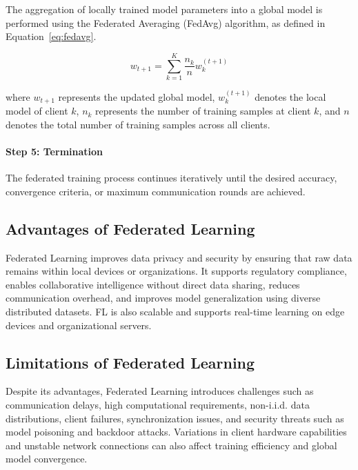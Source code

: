 The aggregation of locally trained model parameters into a global model is performed using the Federated Averaging (FedAvg) algorithm, as defined in Equation~\eqref{eq:fedavg}.

\begin{equation}
w_{t+1} = \sum_{k=1}^{K} \frac{n_k}{n} w_k^{(t+1)}
\label{eq:fedavg}
\end{equation}

where \(w_{t+1}\) represents the updated global model, \(w_k^{(t+1)}\) denotes the local model of client \(k\), \(n_k\) represents the number of training samples at client \(k\), and \(n\) denotes the total number of training samples across all clients.

\paragraph{Step 5: Termination}

The federated training process continues iteratively until the desired accuracy, convergence criteria, or maximum communication rounds are achieved.

\subsection{Advantages of Federated Learning}

Federated Learning improves data privacy and security by ensuring that raw data remains within local devices or organizations. It supports regulatory compliance, enables collaborative intelligence without direct data sharing, reduces communication overhead, and improves model generalization using diverse distributed datasets. FL is also scalable and supports real-time learning on edge devices and organizational servers.

\subsection{Limitations of Federated Learning}

Despite its advantages, Federated Learning introduces challenges such as communication delays, high computational requirements, non-i.i.d. data distributions, client failures, synchronization issues, and security threats such as model poisoning and backdoor attacks. Variations in client hardware capabilities and unstable network connections can also affect training efficiency and global model convergence.


